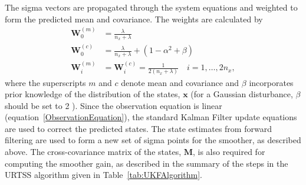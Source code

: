 \documentclass[review,authoryear,3p]{elsarticle}
\begin{document}
The sigma vectors are propagated through the system equations and weighted to form the predicted mean and covariance. The weights are calculated by 
\begin{align}
	\mathbf W_0^{(m)}&=\frac{\lambda}{ n_x+\lambda} \\
	\mathbf W_0^{(c)}&=\frac{\lambda}{ n_x+\lambda}+(1-\alpha^2+\beta) \\
	\mathbf W_i^{(m)}&=\mathbf W_i^{(c)}=\frac{1}{2( n_x+\lambda)} \quad i=1, \dots, 2n_x, 
\end{align}
where the superscripts $m$ and $c$ denote mean and covariance and $\beta$ incorporates prior knowledge of the distribution of the states, $\mathbf{x}$ (for a Gaussian disturbance, $\beta$ should be set to 2 \citep{Haykin2001}). Since the observation equation is linear (equation~\ref{ObservationEquation}), the standard Kalman Filter update equations are used to correct the predicted states. The state estimates from forward filtering are used to form a new set of sigma points for the smoother, as described above. The cross-covariance matrix of the states, $\mathbf M$, is also required for computing the smoother gain, as described in the summary of the steps in the URTSS algorithm given in Table~\ref{tab:UKFAlgorithm}.
\end{document}
